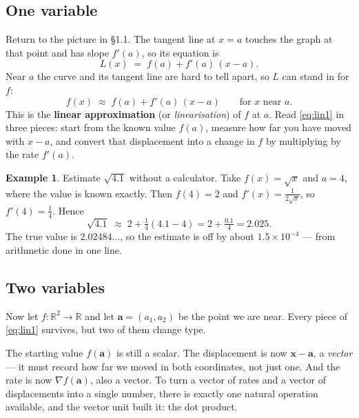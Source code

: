 \documentclass[11pt]{article}
\theoremstyle{plain}
\theoremstyle{definition}
\newtheorem{ex}{Example}[section]
\theoremstyle{remark}
\newcommand{\R}{\mathbb{R}}
\newcommand{\vc}[1]{\mathbf{#1}}
\newcommand{\grad}{\nabla}
\begin{document}
\subsection{One variable}
Return to the picture in \S1.1. The tangent line at $x=a$ touches the graph at
that point and has slope $f'(a)$, so its equation is
\begin{equation}\label{eq:lin1}
  L(x) \;=\; f(a) + f'(a)\,(x-a) .
\end{equation}
Near $a$ the curve and its tangent line are hard to tell apart, so $L$ can stand
in for $f$:
\[
  f(x) \;\approx\; f(a) + f'(a)\,(x-a)
  \qquad\text{for } x \text{ near } a .
\]
This is the \textbf{linear approximation} (or \emph{linearisation}) of $f$ at
$a$. Read \eqref{eq:lin1} in three pieces: start from the known value $f(a)$,
measure how far you have moved with $x-a$, and convert that displacement into a
change in $f$ by multiplying by the rate $f'(a)$.

\begin{ex}
Estimate $\sqrt{4.1}$ without a calculator. Take $f(x)=\sqrt{x}$ and $a=4$,
where the value is known exactly. Then $f(4)=2$ and
$f'(x)=\tfrac{1}{2\sqrt{x}}$, so $f'(4)=\tfrac14$. Hence
\[
  \sqrt{4.1}\;\approx\; 2 + \tfrac14(4.1-4) = 2 + \tfrac{0.1}{4} = 2.025 .
\]
The true value is $2.02484\ldots$, so the estimate is off by about $1.5\times
10^{-4}$ --- from arithmetic done in one line.
\end{ex}

\subsection{Two variables}
Now let $f:\R^{2}\to\R$ and let $\vc{a}=(a_1,a_2)$ be the point we are near.
Every piece of \eqref{eq:lin1} survives, but two of them change type.

The starting value $f(\vc{a})$ is still a scalar. The displacement is now
$\vc{x}-\vc{a}$, a \emph{vector} --- it must record how far we moved in both
coordinates, not just one. And the rate is now $\grad f(\vc{a})$, also a vector.
To turn a vector of rates and a vector of displacements into a single number,
there is exactly one natural operation available, and the vector unit built it:
the dot product.
\end{document}
